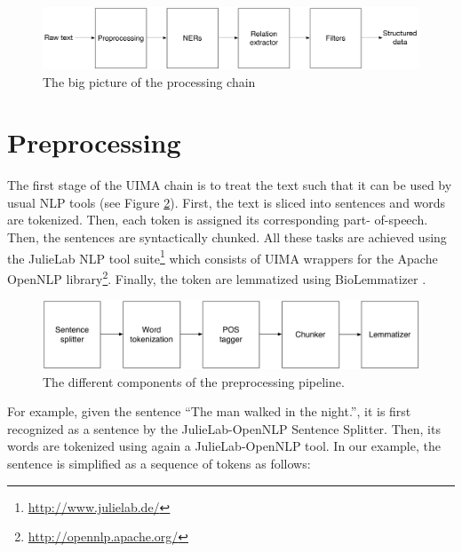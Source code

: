 \documentclass{report}
\begin{document}
                \begin{figure}[h]
					\centering
					\includegraphics[width=\textwidth]{fig/global_pipeline.pdf}
					\caption{The big picture of the processing chain}
					\label{fig:global_pipeline}
                \end{figure}
                
                \section{Preprocessing}
                \label{sec:preprocessing}
                The first stage of the UIMA chain is to treat the text such
                that it can be used by usual NLP tools (see Figure \ref{fig:preprocessing}). First, the text is
                sliced into sentences
                and words are tokenized. Then, each token is assigned its corresponding part-
                of-speech. Then, the sentences are syntactically chunked. All these tasks are
                achieved using the JulieLab NLP tool suite\footnote{\url{http://www.julielab.de/}} which consists
                of UIMA wrappers for the Apache OpenNLP library\footnote{\url{http://opennlp.apache.org/}}. 
                Finally, the token are lemmatized using BioLemmatizer \cite{biolemmatizer}.

                \begin{figure}[h]
                  \includegraphics[width=\textwidth]{fig/preprocess_diagram.pdf}
                  \caption{The different components of the preprocessing pipeline.}
                  \label{fig:preprocessing}
                \end{figure}

                For example, given the sentence ``The man walked in the night.'', it is first recognized as
                a sentence by the JulieLab-OpenNLP Sentence Splitter. Then, its words are tokenized
                using again a JulieLab-OpenNLP tool. In our example, the sentence is simplified as 
                a sequence of tokens as follows:
                
\end{document}

